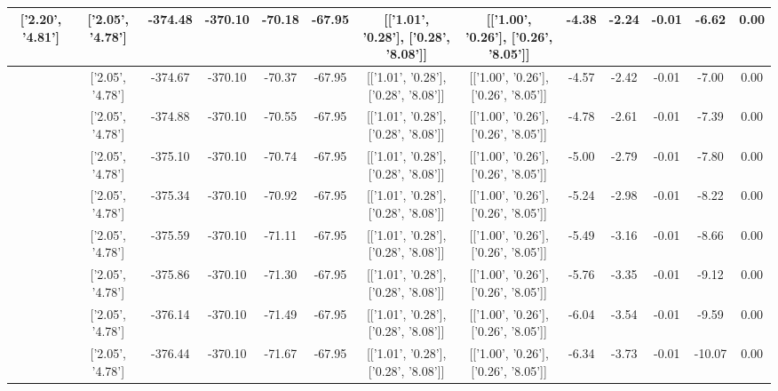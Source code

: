 \begin{table}[htbp]
\begin{adjustbox}{angle=90}
\begin{tabular}{|c|c|c|c|c|c|c|c|c|c|c|c|c|}
 ['2.20', '4.81'] & ['2.05', '4.78'] & -374.48 & -370.10 & -70.18 & -67.95 & [['1.01', '0.28'], ['0.28', '8.08']] & [['1.00', '0.26'], ['0.26', '8.05']] & -4.38 & -2.24 & -0.01 & -6.62 & 0.00\\ \hline
 ['2.21', '4.82'] & ['2.05', '4.78'] & -374.67 & -370.10 & -70.37 & -67.95 & [['1.01', '0.28'], ['0.28', '8.08']] & [['1.00', '0.26'], ['0.26', '8.05']] & -4.57 & -2.42 & -0.01 & -7.00 & 0.00\\ \hline
 ['2.22', '4.82'] & ['2.05', '4.78'] & -374.88 & -370.10 & -70.55 & -67.95 & [['1.01', '0.28'], ['0.28', '8.08']] & [['1.00', '0.26'], ['0.26', '8.05']] & -4.78 & -2.61 & -0.01 & -7.39 & 0.00\\ \hline
 ['2.23', '4.82'] & ['2.05', '4.78'] & -375.10 & -370.10 & -70.74 & -67.95 & [['1.01', '0.28'], ['0.28', '8.08']] & [['1.00', '0.26'], ['0.26', '8.05']] & -5.00 & -2.79 & -0.01 & -7.80 & 0.00\\ \hline
 ['2.24', '4.82'] & ['2.05', '4.78'] & -375.34 & -370.10 & -70.92 & -67.95 & [['1.01', '0.28'], ['0.28', '8.08']] & [['1.00', '0.26'], ['0.26', '8.05']] & -5.24 & -2.98 & -0.01 & -8.22 & 0.00\\ \hline
 ['2.25', '4.82'] & ['2.05', '4.78'] & -375.59 & -370.10 & -71.11 & -67.95 & [['1.01', '0.28'], ['0.28', '8.08']] & [['1.00', '0.26'], ['0.26', '8.05']] & -5.49 & -3.16 & -0.01 & -8.66 & 0.00\\ \hline
 ['2.26', '4.83'] & ['2.05', '4.78'] & -375.86 & -370.10 & -71.30 & -67.95 & [['1.01', '0.28'], ['0.28', '8.08']] & [['1.00', '0.26'], ['0.26', '8.05']] & -5.76 & -3.35 & -0.01 & -9.12 & 0.00\\ \hline
 ['2.28', '4.83'] & ['2.05', '4.78'] & -376.14 & -370.10 & -71.49 & -67.95 & [['1.01', '0.28'], ['0.28', '8.08']] & [['1.00', '0.26'], ['0.26', '8.05']] & -6.04 & -3.54 & -0.01 & -9.59 & 0.00\\ \hline
 ['2.29', '4.83'] & ['2.05', '4.78'] & -376.44 & -370.10 & -71.67 & -67.95 & [['1.01', '0.28'], ['0.28', '8.08']] & [['1.00', '0.26'], ['0.26', '8.05']] & -6.34 & -3.73 & -0.01 & -10.07 & 0.00\\ \hline
            \end{tabular}
        \end{adjustbox}
        \caption{}
        \label{}
    \end{table}
    